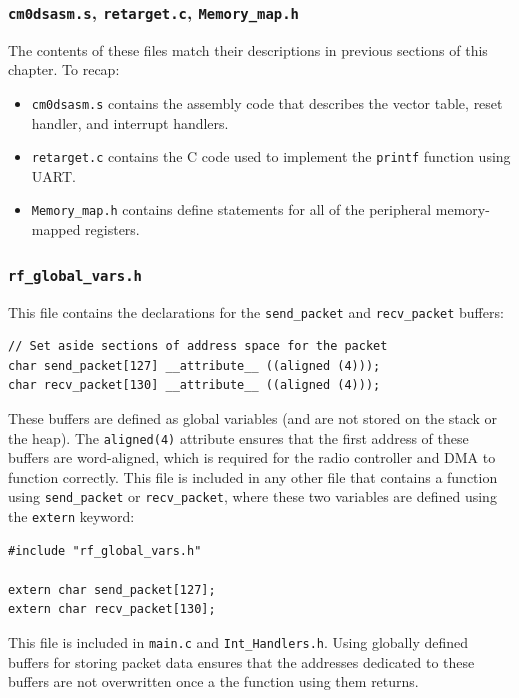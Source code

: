 \subsubsection{\texttt{cm0dsasm.s}, \texttt{retarget.c}, \texttt{Memory\_map.h}}
The contents of these files match their descriptions in previous sections of this chapter. To recap:

\begin{itemize}
	\item \texttt{cm0dsasm.s} contains the assembly code that describes the vector table, reset handler, and interrupt handlers.
	\item \texttt{retarget.c} contains the C code used to implement the \texttt{printf} function using UART.
	\item \texttt{Memory\_map.h} contains define statements for all of the peripheral memory-mapped registers.
\end{itemize}

\subsubsection{\texttt{rf\_global\_vars.h}}
This file contains the declarations for the \texttt{send\_packet} and \texttt{recv\_packet} buffers:

\begin{lstlisting}
// Set aside sections of address space for the packet
char send_packet[127] __attribute__ ((aligned (4)));
char recv_packet[130] __attribute__ ((aligned (4)));
\end{lstlisting}

These buffers are defined as global variables (and are not stored on the stack or the heap). The \texttt{aligned(4)} attribute ensures that the first address of these buffers are word-aligned, which is required for the radio controller and DMA to function correctly. This file is included in any other file that contains a function using \texttt{send\_packet} or \texttt{recv\_packet}, where these two variables are defined using the \texttt{extern} keyword:

\begin{lstlisting}
#include "rf_global_vars.h"

extern char send_packet[127];
extern char recv_packet[130];
\end{lstlisting}

This file is included in \texttt{main.c} and \texttt{Int\_Handlers.h}. Using globally defined buffers for storing packet data ensures that the addresses dedicated to these buffers are not overwritten once a the function using them returns.

